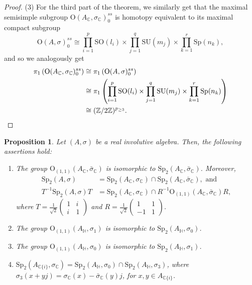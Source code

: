 \documentclass[oneside,11pt]{amsart}
\newtheorem{prop}[thm]{Proposition}
\theoremstyle{definition}
\theoremstyle{remark}
\numberwithin{thm}{section}
\numberwithin{equation}{section}
\begin{document}
\begin{proof}
(3) For the third part of the theorem, we similarly get that the maximal semisimple subgroup $\mathrm{O}(A_\mathbb{C}, \sigma_{\mathbb{C}})_0^{ss}$ is homotopy equivalent to its maximal compact subgroup \[\mathrm{O}(A, \sigma)_0^{ss} \cong \prod_{i=1}^p \mathrm{SO}(l_i) \times \prod_{j=1}^q \mathrm{SU}(m_j) \times\prod_{k=1}^r \mathrm{Sp}(n_k),\]  
and so we analogously get 
\begin{align*}
\pi_1\left( \mathrm{O}(A_\mathbb{C}, \sigma_{\mathbb{C}})_0^{ss}\right) & \cong \pi_1\left(\mathrm{O}(A, \sigma)_0^{ss}\right)\\
& \cong \pi_1\left( \prod_{i=1}^p \mathrm{SO}(l_i) \times \prod_{j=1}^q \mathrm{SU}(m_j) \times\prod_{k=1}^r \mathrm{Sp}(n_k)\right)\\
& \cong (\mathbb{Z}/2\mathbb{Z})^{p_{\geq3}}. \qedhere
\end{align*}
\end{proof}



\begin{prop}\label{prop:incarn}
    Let $(A,\sigma)$ be a real involutive algebra. Then, the following assertions hold:
    \begin{enumerate}    
        \item The group $\mathrm{O}_{(1,1)}(A_\mathbb C,\bar\sigma_\mathbb C)$ is isomorphic to 
        $\mathrm{Sp}_{2}(A_\mathbb C,\bar\sigma_\mathbb C)$. Moreover,
        \begin{align*}
        \mathrm{Sp}_2(A,\sigma)&=\mathrm{Sp}_{2}(A_\mathbb C,\sigma_\mathbb C)\cap \mathrm{Sp}_{2}(A_\mathbb C,\bar\sigma_\mathbb C), \text{ and }\\
         T^{-1}\mathrm{Sp}_2(A,\sigma)T&=\mathrm{Sp}_{2}(A_\mathbb C,\sigma_\mathbb C)\cap R^{-1}\mathrm{O}_{(1,1)}(A_\mathbb C,\bar\sigma_\mathbb C)R,
        \end{align*}
        where $T=\frac{1}{\sqrt{2}}\begin{pmatrix}
        1 & i \\
        i & 1 \end{pmatrix}$ and $R=\frac{1}{\sqrt{2}}\begin{pmatrix}
        1 & 1 \\
        -1 & 1 \end{pmatrix}$.
        \item The group $\mathrm{O}_{(1,1)}(A_\mathbb H,\sigma_1)$ is isomorphic to $\mathrm{Sp}_{2}(A_\mathbb H,\sigma_0)$.
        \item The group $\mathrm{O}_{(1,1)}(A_\mathbb H,\sigma_0)$ is isomorphic to $\mathrm{Sp}_{2}(A_\mathbb H,\sigma_1)$.
        \item $\mathrm{Sp}_{2}(A_{\mathbb C\{i\}},\sigma_\mathbb C)=\mathrm{Sp}_{2}(A_\mathbb H,\sigma_0)\cap \mathrm{Sp}_{2}(A_\mathbb H,\sigma_3)$, where $\sigma_3(x+yj)={\sigma}_{\mathbb{C}}(x)-\bar{\sigma}_{\mathbb{C}}(y)j$, for $x,y\in A_{\mathbb C\{i\}}$.    
    \end{enumerate}
\end{prop}
\end{document}
